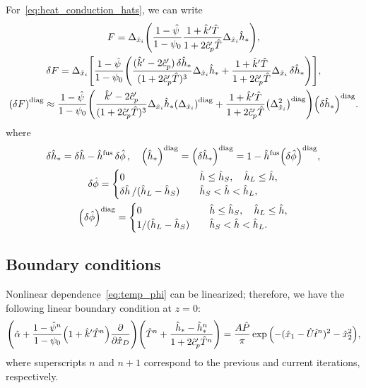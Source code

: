 \documentclass{article}
\newcommand{\dder}[2][]{\Delta_{#2}#1}
\newcommand{\diag}[1]{\qty(#1)^\mathrm{diag}}
\newcommand{\fusion}[1]{{#1}^\mathrm{fus}}
\begin{document}
For~\eqref{eq:heat_conduction_hats}, we can write
\begin{gather}
    F = \dder{\hat{x}_i}\qty(
        \frac{1 - \hat{\psi}}{1 - \psi_0}
	    \frac{1 + \hat{k}'\hat{T}}{1 + 2\hat{c}_p'\hat{T}}
	    \dder[\hat{h}_*]{\hat{x}_i}
	), \\
    \var{F} = \dder{\hat{x}_i}\qty[ \frac{1 - \hat{\psi}}{1 - \psi_0} \qty(
	    \frac{(\hat{k}' - 2\hat{c}_p')\var{\hat{h}_*}}{(1 + 2\hat{c}_p'\hat{T})^3}
	     \dder[\hat{h}_*]{\hat{x}_i}
	    +
	    \frac{1 + \hat{k}'\hat{T}}{1 + 2\hat{c}_p'\hat{T}}
	    \dder[\var{\hat{h}_*}]{\hat{x}_i}
	)], \\
    \diag{\var{F}} \approx \frac{1 - \hat{\psi}}{1 - \psi_0} \qty(
	    \frac{\hat{k}' - 2\hat{c}_p'}{(1 + 2\hat{c}_p'\hat{T})^3} \dder[\hat{h}_*]{\hat{x}_i} \diag{\dder{\hat{x}_i}}
	    +
	    \frac{1 + \hat{k}'\hat{T}}{1 + 2\hat{c}_p'\hat{T}}
	    \diag{\dder{\hat{x}_i}^2}
	)\diag{\var{\hat{h}_*}}.
\end{gather}
where
\begin{gather}
    \var{\hat{h}_*} = \var{\hat{h}} - \fusion{\hat{h}}\var{\hat\phi}, \quad
    \diag{\hat{h}_*} = \diag{\var{\hat{h}_*}} = 1 - \fusion{\hat{h}}\diag{\var{\hat\phi}}, \\
	\var{\hat{\phi}} = \begin{cases}
        0 & \quad \hat{h} \leq \hat{h}_S, \quad \hat{h}_L \leq \hat{h}, \\
        \var{\hat{h}}/(\hat{h}_L-\hat{h}_S) & \quad \hat{h}_S < \hat{h} < \hat{h}_L, \\
    \end{cases} \label{eq:pert_phi_h}\\
	\diag{\var{\hat{\phi}}} = \begin{cases}
        0 & \quad \hat{h} \leq \hat{h}_S, \quad \hat{h}_L \leq \hat{h}, \\
        1/(\hat{h}_L-\hat{h}_S) & \quad \hat{h}_S < \hat{h} < \hat{h}_L. \\
    \end{cases} \label{eq:pert_phi_h_diag}
\end{gather}

\subsection{Boundary conditions}

Nonlinear dependence~\eqref{eq:temp_phi} can be linearized; therefore, we have the following linear boundary condition at \(z=0\):
\begin{equation}\label{eq:bc_linearized}
	\qty( \hat{\alpha} + \frac{1 - \hat{\psi}^n}{1 - \psi_0}\qty( 1 + \hat{k}'\hat{T}^n )\pdv{\hat{x}_D} )
	    \qty( \hat{T}^n + \frac{\hat{h}_* - \hat{h}_*^n}{1+2\hat{c}_p'\hat{T}^n} )
	    = \frac{A\hat{P}}{\pi}\exp\qty( -(\hat{x}_1-\hat{U}\hat{t}^n)^2 - \hat{x}_2^2 ),
\end{equation}
where superscripts \(n\) and \(n+1\) correspond to the previous and current iterations, respectively.

\end{document}

